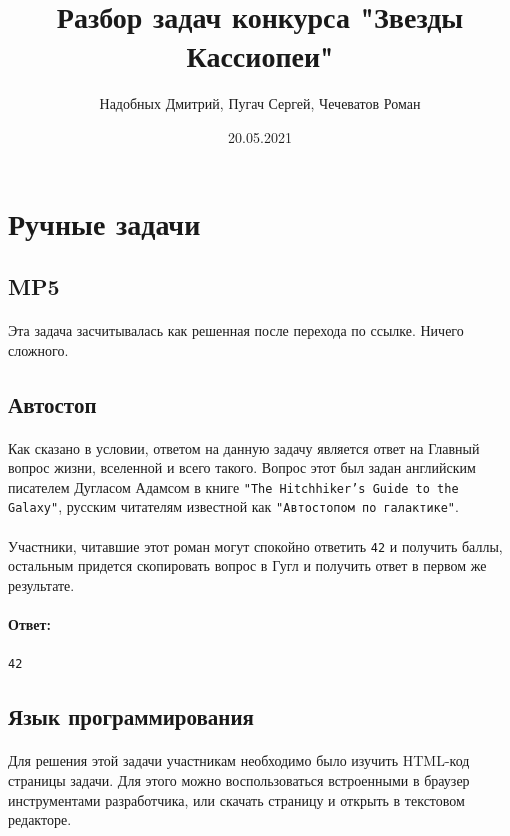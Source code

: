 \documentclass[12pt]{article}
\title{Разбор задач конкурса "Звезды Кассиопеи"}
\date{20.05.2021}
\author{Надобных Дмитрий, Пугач Сергей, Чечеватов Роман}
\begin{document}
    \maketitle
    \newpage
    \raggedright

    \section{Ручные задачи}

    \subsection{MP5}
    \paragraph{}
    Эта задача засчитывалась как решенная после перехода по ссылке.
    Ничего сложного.

    \subsection{Автостоп}
    \paragraph{}
    Как сказано в условии, ответом на данную задачу является ответ на Главный вопрос жизни, вселенной и всего такого.
    Вопрос этот был задан английским писателем Дугласом Адамсом в книге \verb|"The Hitchhiker’s Guide to the Galaxy"|,
    русским читателям известной как \verb|"Автостопом по галактике"|.
    \paragraph{}
    Участники, читавшие этот роман могут спокойно ответить \verb|42| и получить баллы,
    остальным придется скопировать вопрос в Гугл и получить ответ в первом же результате.
    \paragraph{Ответ:}
    \verb|42|

    \subsection{Язык программирования}
	\paragraph{}
    Для решения этой задачи участникам необходимо было изучить HTML-код страницы задачи.
	Для этого можно воспользоваться встроенными в браузер инструментами разработчика,
	или скачать страницу и открыть в текстовом редакторе.
\end{document}
